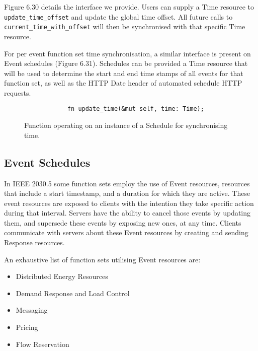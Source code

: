 Figure 6.30 details the interface we provide. Users can supply a Time resource to \texttt{update\_time\_offset} and update the global time offset. All future calls to \texttt{current\_time\_with\_offset} will then be synchronised with that specific Time resource.

For per event function set time synchronisation, a similar interface is present on Event schedules (Figure 6.31). Schedules can be provided a Time resource that will be used to determine the start and end time stamps of all events for that function set, as well as the HTTP Date header of automated schedule HTTP requests.

\begin{figure}[h]
    \begin{center}
        \begin{lstlisting}
            fn update_time(&mut self, time: Time);
        \end{lstlisting}
        \label{fig:eventtime}
        \vspace{-10pt}
        \caption{Function operating on an instance of a Schedule for synchronising time.}
    \end{center}
\end{figure}

\subsection{Event Schedules}
In IEEE 2030.5 some function sets employ the use of Event resources, resources that include a start timestamp, and a duration for which they are active. These event resources are exposed to clients with the intention they take specific action during that interval. Servers have the ability to cancel those events by updating them, and supersede these events by exposing new ones, at any time. Clients communicate with servers about these Event resources by creating and sending Response resources. 

An exhaustive list of function sets utilising Event resources are:

\begin{itemize}
    \item Distributed Energy Resources
    \item Demand Response and Load Control
    \item Messaging
    \item Pricing
    \item Flow Reservation
\end{itemize}

